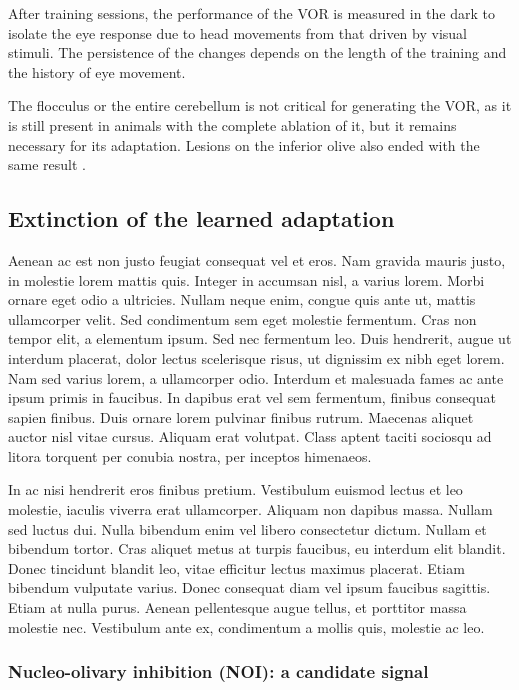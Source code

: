 \documentclass[12pt, a4paper,twoside]{tesi_upf}
\begin{document}
After training sessions, the performance of the VOR is measured in the dark to isolate the eye response due to head movements from that driven by visual stimuli. The persistence of the changes depends on the length of the training and the history of eye movement.

The flocculus or the entire cerebellum is not critical for generating the VOR, as it is still present in animals with the complete ablation of it, but it remains necessary for its adaptation. Lesions on the inferior olive also ended with the same result \cite{Ito2006}.

\subsection{Extinction of the learned adaptation}

Aenean ac est non justo feugiat consequat vel et eros. Nam gravida mauris justo, in molestie lorem mattis quis. Integer in accumsan nisl, a varius lorem. Morbi ornare eget odio a ultricies. Nullam neque enim, congue quis ante ut, mattis ullamcorper velit. Sed condimentum sem eget molestie fermentum. Cras non tempor elit, a elementum ipsum. Sed nec fermentum leo. Duis hendrerit, augue ut interdum placerat, dolor lectus scelerisque risus, ut dignissim ex nibh eget lorem. Nam sed varius lorem, a ullamcorper odio. Interdum et malesuada fames ac ante ipsum primis in faucibus. In dapibus erat vel sem fermentum, finibus consequat sapien finibus. Duis ornare lorem pulvinar finibus rutrum. Maecenas aliquet auctor nisl vitae cursus. Aliquam erat volutpat. Class aptent taciti sociosqu ad litora torquent per conubia nostra, per inceptos himenaeos.

In ac nisi hendrerit eros finibus pretium. Vestibulum euismod lectus et leo molestie, iaculis viverra erat ullamcorper. Aliquam non dapibus massa. Nullam sed luctus dui. Nulla bibendum enim vel libero consectetur dictum. Nullam et bibendum tortor. Cras aliquet metus at turpis faucibus, eu interdum elit blandit. Donec tincidunt blandit leo, vitae efficitur lectus maximus placerat. Etiam bibendum vulputate varius. Donec consequat diam vel ipsum faucibus sagittis. Etiam at nulla purus. Aenean pellentesque augue tellus, et porttitor massa molestie nec. Vestibulum ante ex, condimentum a mollis quis, molestie ac leo.

\subsubsection{Nucleo-olivary inhibition (NOI): a candidate signal}
\end{document}
